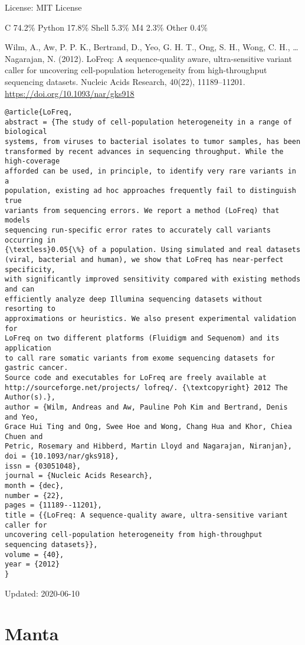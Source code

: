 \documentclass[]{article}
\begin{document}
License: MIT License

C 74.2\% Python 17.8\% Shell 5.3\% M4 2.3\% Other 0.4\%

Wilm, A., Aw, P. P. K., Bertrand, D., Yeo, G. H. T., Ong, S. H., Wong, C. H., … Nagarajan, N. (2012). LoFreq: A sequence-quality aware, ultra-sensitive variant caller for uncovering cell-population heterogeneity from high-throughput sequencing datasets. Nucleic Acids Research, 40(22), 11189–11201. \url{https://doi.org/10.1093/nar/gks918}

\begin{verbatim}
@article{LoFreq,
abstract = {The study of cell-population heterogeneity in a range of biological
systems, from viruses to bacterial isolates to tumor samples, has been
transformed by recent advances in sequencing throughput. While the high-coverage
afforded can be used, in principle, to identify very rare variants in a
population, existing ad hoc approaches frequently fail to distinguish true
variants from sequencing errors. We report a method (LoFreq) that models
sequencing run-specific error rates to accurately call variants occurring in
{\textless}0.05{\%} of a population. Using simulated and real datasets
(viral, bacterial and human), we show that LoFreq has near-perfect specificity,
with significantly improved sensitivity compared with existing methods and can
efficiently analyze deep Illumina sequencing datasets without resorting to
approximations or heuristics. We also present experimental validation for
LoFreq on two different platforms (Fluidigm and Sequenom) and its application
to call rare somatic variants from exome sequencing datasets for gastric cancer.
Source code and executables for LoFreq are freely available at
http://sourceforge.net/projects/ lofreq/. {\textcopyright} 2012 The Author(s).},
author = {Wilm, Andreas and Aw, Pauline Poh Kim and Bertrand, Denis and Yeo,
Grace Hui Ting and Ong, Swee Hoe and Wong, Chang Hua and Khor, Chiea Chuen and
Petric, Rosemary and Hibberd, Martin Lloyd and Nagarajan, Niranjan},
doi = {10.1093/nar/gks918},
issn = {03051048},
journal = {Nucleic Acids Research},
month = {dec},
number = {22},
pages = {11189--11201},
title = {{LoFreq: A sequence-quality aware, ultra-sensitive variant caller for
uncovering cell-population heterogeneity from high-throughput sequencing datasets}},
volume = {40},
year = {2012}
}
\end{verbatim}

Updated: 2020-06-10
\section{Manta}
\end{document}
